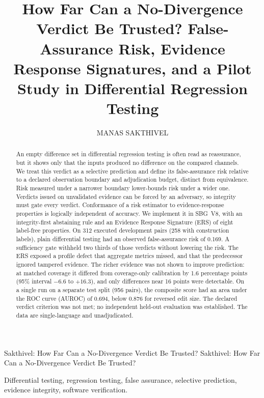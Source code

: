 \documentclass{ieeeaccess}
\begin{document}
\history{}
\doi{}

\title{How Far Can a No-Divergence Verdict Be Trusted? False-Assurance Risk, Evidence Response Signatures, and a Pilot Study in Differential Regression Testing}

\author{\uppercase{Manas Sakthivel}}


\markboth
{Sakthivel: How Far Can a No-Divergence Verdict Be Trusted?}
{Sakthivel: How Far Can a No-Divergence Verdict Be Trusted?}


\begin{abstract}
An empty difference set in differential regression testing is often read as reassurance, but it shows only that the inputs produced no difference on the compared channels. We treat this verdict as a selective prediction and define its false-assurance risk relative to a declared observation boundary and adjudication budget, distinct from equivalence. Risk measured under a narrower boundary lower-bounds risk under a wider one. Verdicts issued on unvalidated evidence can be forced by an adversary, so integrity must gate every verdict. Conformance of a risk estimator to evidence-response properties is logically independent of accuracy. We implement it in SBG~V8, with an integrity-first abstaining rule and an Evidence Response Signature (ERS) of eight label-free properties. On 312 executed development pairs (258 with construction labels), plain differential testing had an observed false-assurance risk of 0.169. A sufficiency gate withheld two thirds of those verdicts without lowering the risk. The ERS exposed a profile defect that aggregate metrics missed, and that the predecessor ignored tampered evidence. The richer evidence was not shown to improve prediction: at matched coverage it differed from coverage-only calibration by 1.6 percentage points (95\% interval $-6.6$ to $+16.3$), and only differences near 16 points were detectable. On a single run on a separate test split (956 pairs), the composite score had an area under the ROC curve (AUROC) of 0.694, below 0.876 for reversed edit size. The declared verdict criterion was not met; no independent held-out evaluation was established. The data are single-language and unadjudicated.
\end{abstract}

\begin{keywords}
Differential testing, regression testing, false assurance, selective prediction, evidence integrity, software verification.
\end{keywords}
\end{document}
